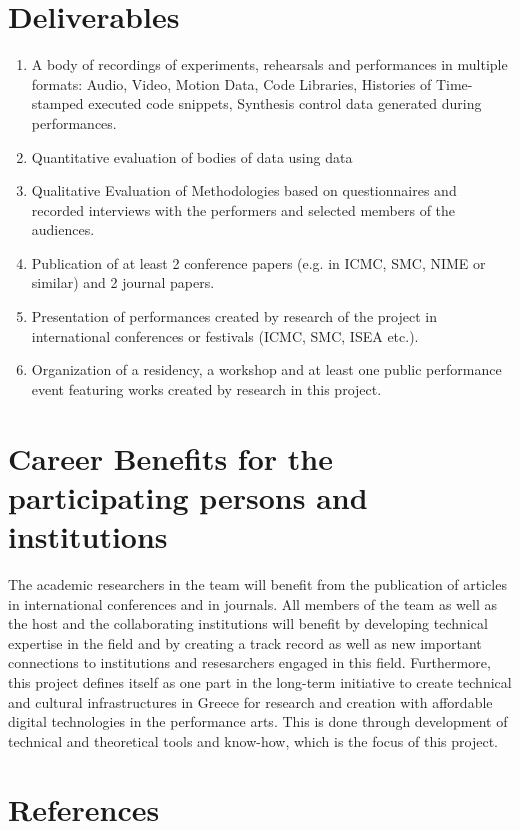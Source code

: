 \section{Deliverables}
\label{sec:org2136995}
\begin{enumerate}
\item A body of recordings of experiments, rehearsals and performances in multiple formats: Audio, Video, Motion Data, Code Libraries, Histories of Time-stamped executed code snippets, Synthesis control data generated during performances.
\item Quantitative evaluation of bodies of data using data
\item Qualitative Evaluation of Methodologies based on questionnaires and recorded interviews with the performers and selected members of the audiences.
\item Publication of at least 2 conference papers (e.g. in ICMC, SMC, NIME or similar) and 2 journal papers.
\item Presentation of performances created by research of the project in international conferences or festivals (ICMC, SMC, ISEA etc.).
\item Organization of a residency, a workshop and at least one public performance event featuring works created by research in this project.
\end{enumerate}

\section{Career Benefits for the participating persons and institutions}
\label{sec:org84ab4b2}
The academic researchers in the team will benefit from the publication of articles in international conferences and in journals.  All members of the team as well as the host and the collaborating institutions will benefit by developing technical expertise in the field and by creating a track record as well as new important connections to institutions and resesarchers engaged in this field.  Furthermore, this project defines itself as one part in the long-term initiative to create technical and cultural infrastructures in Greece for research and creation with affordable digital technologies in the performance arts.  This is done through development of technical and theoretical tools and know-how, which is the focus of this project.

\section{References}
\label{sec:orgea22110}
\setlength{\parindent}{-0.2in}
\setlength{\leftskip}{0.2in}
\setlength{\parskip}{0.1cm plus 4mm minus 3mm}
\noindent

